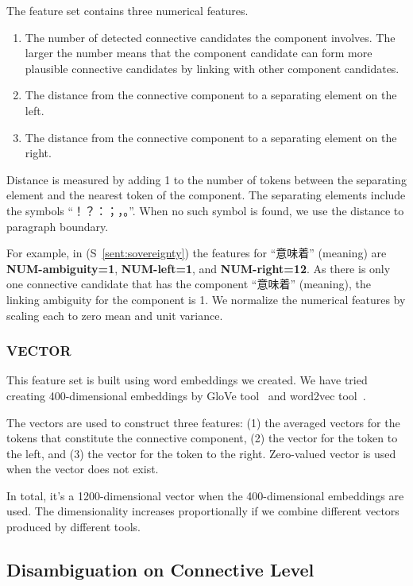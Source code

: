 The feature set contains three numerical features.

\begin{enumerate}
    \item The number of detected connective candidates the component involves. The larger
        the number means that the component candidate can form more plausible connective
        candidates by linking with other component candidates.
    \item The distance from the connective component to a separating element on the left.
    \item The distance from the connective component to a
        separating element on the right.
\end{enumerate}

Distance is measured by adding 1 to the number of tokens
between the separating element and the nearest token of the component.
The separating elements include the symbols ``！？：；，。''.
When no such symbol is found, we use the distance to paragraph boundary.

For example, in (S~\ref{sent:sovereignty}) the features for “意味着” (meaning) are \textbf{NUM-ambiguity=1},
\textbf{NUM-left=1}, and \textbf{NUM-right=12}. As there is only one connective candidate that has the
component “意味着” (meaning), the linking ambiguity for the component is 1.
We normalize the numerical features by scaling each to zero mean and unit variance.


\subsubsection{VECTOR}

This feature set is built using word embeddings we created.
We have tried creating 400-dimensional embeddings by GloVe tool~\citep{pennington2014glove}
and word2vec tool~\citep{mikolov2013efficient,mikolov2013distributed}.

The vectors are used to construct three features: (1) the averaged vectors
for the tokens that constitute the connective component, (2) the vector for the
token to the left, and (3) the vector for the token to the right. Zero-valued vector is used
when the vector does not exist.

In total, it's a 1200-dimensional vector when the 400-dimensional embeddings are used.
The dimensionality increases proportionally if we combine different vectors produced by
different tools.

\subsection{Disambiguation on Connective Level}
\label{s:discourse-disambig-connective}


